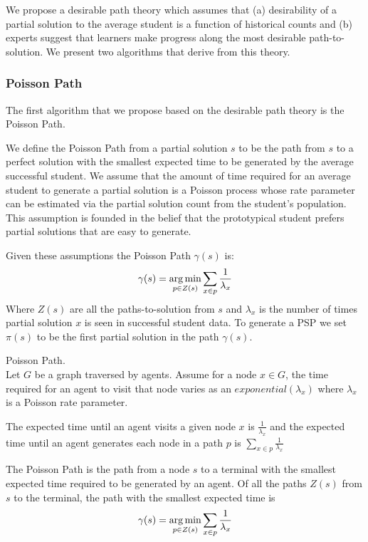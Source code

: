 We propose a desirable path theory which assumes that (a) desirability of a partial solution to the average student is a function of historical counts and (b) experts suggest that learners make progress along the most desirable path-to-solution. We present two algorithms that derive from this theory. 

\subsubsection{Poisson Path}

The first algorithm that we propose based on the desirable path theory is the Poisson Path.

We define the Poisson Path from a partial solution $s$ to be the path from $s$ to a perfect solution with the smallest expected time to be generated by the average successful student. We assume that the amount of time required for an average student to generate a partial solution is a Poisson process whose rate parameter can be estimated via the partial solution count from the student's population. This assumption is founded in the belief that the prototypical student prefers partial solutions that are easy to generate.

Given these assumptions the Poisson Path $\gamma(s)$ is:
\begin{align*}
\gamma(s)=\operatorname*{arg\,min}_{p \in Z(s)}{\sum_{x \in p}{\frac{1}{\lambda_x}}}
\end{align*}
Where $Z(s)$ are all the paths-to-solution from $s$ and $\lambda_x$ is the number of times partial solution $x$ is seen in successful student data. To generate a PSP we set $\pi(s)$ to be the first partial solution in the path $\gamma(s)$. 



\begin{defo}
Poisson Path. \\ 
Let $G$ be a graph traversed by agents. Assume for a node $x \in G$, the time required for an agent to visit that node varies as an $exponential(\lambda_x)$ where $\lambda_x$ is a Poisson rate parameter. 

The expected time until an agent visits a given node $x$ is $\frac{1}{\lambda_x}$ and the expected time until an agent generates each node in a path $p$ is 
$\sum_{x \in p}{\frac{1}{\lambda_x}}$


The Poisson Path is the path from a node $s$ to a terminal with the smallest expected time required to be generated by an agent. Of all the paths $Z(s)$ from $s$ to the terminal, the path with the smallest expected time is 
\begin{align*}
\gamma(s)=\operatorname*{arg\,min}_{p \in Z(s)}{\sum_{x \in p}{\frac{1}{\lambda_x}}}
\end{align*}
\label{pcpDef}
\end{defo}

